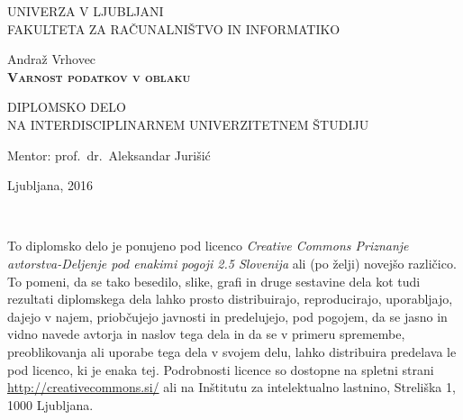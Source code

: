 \documentclass[12pt,a4paper,openany]{book}
\begin{document}
\thispagestyle{empty}

\begin{center}
{\large
UNIVERZA V LJUBLJANI\\
FAKULTETA ZA RAČUNALNIŠTVO IN INFORMATIKO\\
}

\vspace{3cm}
{\LARGE Andraž Vrhovec}\\

\vspace{2cm}
\textsc{\textbf{\LARGE
Varnost podatkov v oblaku
}}

\vspace{2cm}
{ DIPLOMSKO DELO}\\
{ NA INTERDISCIPLINARNEM UNIVERZITETNEM ŠTUDIJU
}


\vspace{2cm}
{\Large Mentor: prof.\ dr.\ Aleksandar Jurišić}

\vfill
{\Large Ljubljana, 2016}
\end{center}

\newpage

\ \thispagestyle{empty}

\newpage


\thispagestyle{empty}

\vspace*{5cm}
{\small \noindent
To diplomsko delo je ponujeno pod licenco \textit{Creative Commons Priznanje avtorstva-Deljenje pod enakimi pogoji 2.5 Slovenija}
ali (po želji) novejšo različico.
To pomeni, da se tako besedilo, slike, grafi in druge sestavine dela kot tudi rezultati diplomskega dela lahko prosto distribuirajo,
reproducirajo, uporabljajo, dajejo v najem, priobčujejo javnosti in predelujejo, pod pogojem, da se jasno in vidno navede avtorja in naslov tega
dela in da se v primeru spremembe, preoblikovanja ali uporabe tega dela v svojem delu, lahko distribuira predelava le pod
licenco, ki je enaka tej.
Podrobnosti licence so dostopne na spletni strani \url{http://creativecommons.si/} ali na Inštitutu za
intelektualno lastnino, Streliška 1, 1000 Ljubljana.

\begin{center}%
  \hspace*{1ex}
\end{center}
}
\end{document}
